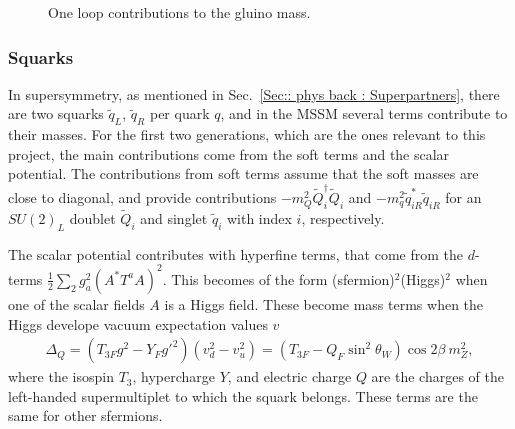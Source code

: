 \documentclass[twoside,english]{uiofysmaster}
\begin{document}
{\begin{figure}
\caption{One loop contributions to the gluino mass.}
\label{Fig:: physical background : Gluino loop contributions}
\end{figure}

\subsubsection{Squarks}
In supersymmetry, as mentioned in Sec.~\ref{Sec:: phys back : Superpartners}, there are two squarks $\widetilde{q}_L$, $\widetilde{q}_R$ per quark $q$, and in the MSSM several terms contribute to their masses. For the first two generations, which are the ones relevant to this project, the main contributions come from the soft terms and the scalar potential. The contributions from soft terms assume that the soft masses are close to diagonal, and provide contributions $-m_Q^2 \widetilde{Q}_i^{\dagger} \widetilde{Q}_i$ and $-m_q^2 \widetilde{q}_{iR}^* \widetilde{q}_{iR}$ for an $SU(2)_L$ doublet $\widetilde{Q}_i$ and singlet $\widetilde{q}_i$ with index $i$, respectively. 

The scalar potential contributes with hyperfine terms, that come from the $d$-terms $\frac{1}{2} \sum_2 g_a^2 (A^* T^a A)^2$. This becomes of the form (sfermion)$^2$(Higgs)$^2$ when one of the scalar fields $A$ is a Higgs field. These become mass terms when the Higgs develope vacuum expectation values $v$
\begin{align}
\Delta_Q = (T_{3F}g^2 - Y_F{g'}^2)(v_d^2 - v_u^2) = (T_{3F} - Q_F \sin^2 \theta_W ) \cos 2 \beta ~ m_Z^2,
\end{align} 
where the isospin $T_3$, hypercharge $Y$, and electric charge $Q$ are the charges of the left-handed supermultiplet to which the squark belongs. These terms are the same for other sfermions. 

}
\end{document}
